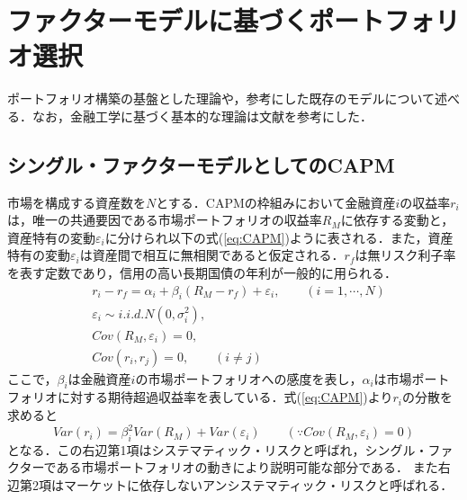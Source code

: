 ﻿\documentclass[11pt]{jreport}
\begin{document}
\chapter{ファクターモデルに基づくポートフォリオ選択}

ポートフォリオ構築の基盤とした理論や，参考にした既存のモデルについて述べる．なお，金融工学に基づく基本的な理論は文献\cite{analyst}\cite{finance}を参考にした．
\section{シングル・ファクターモデルとしてのCAPM}
市場を構成する資産数を$N$とする．CAPMの枠組みにおいて金融資産$i$の収益率$r_i$は，唯一の共通要因である市場ポートフォリオの収益率$R_M$に依存する変動と，資産特有の変動$\varepsilon_i$に分けられ以下の式(\ref{eq:CAPM})ように表される．また，資産特有の変動$\varepsilon_i$は資産間で相互に無相関であると仮定される．$r_f$は無リスク利子率を表す定数であり，信用の高い長期国債の年利が一般的に用られる．
\begin{equation}
\begin{split}
&r_i - r_f = \alpha_i + \beta_i(R_M - r_f) + \varepsilon_i,\qquad(i=1,\cdots,N)\\
&\varepsilon_i \sim i.i.d.N(0,\sigma_i^2),\\
&Cov(R_M, \varepsilon_i) = 0,\\
&Cov(r_i, r_j) = 0, \qquad (i \neq j)
\label{eq:CAPM}
\end{split}
\end{equation}
ここで，$\beta_i$は金融資産$i$の市場ポートフォリオへの感度を表し，$\alpha_i$は市場ポートフォリオに対する期待超過収益率を表している．式(\ref{eq:CAPM})より$r_i$の分散を求めると
\begin{equation}
Var(r_i) = \beta_i^2Var(R_M) + Var(\varepsilon_i) \qquad (\text{∵}Cov(R_M, \varepsilon_i) = 0)
\label{eq:CAPM_var}
\end{equation}
となる．この右辺第1項はシステマティック・リスクと呼ばれ，シングル・ファクターである市場ポートフォリオの動きにより説明可能な部分である．
また右辺第2項はマーケットに依存しないアンシステマティック・リスクと呼ばれる．
\end{document}
